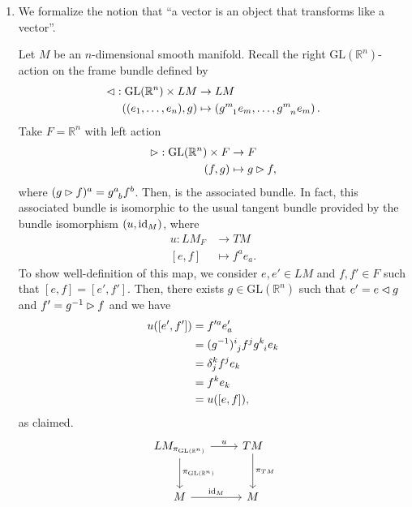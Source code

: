 \begin{example}
    \begin{enumerate}[label=(\alph*)]
        \item We formalize the notion that \enquote{a vector is an object that transforms like a vector}.

            Let \(M\) be an \(n\)-dimensional smooth manifold. Recall the right \(\mathrm{GL}(\mathbb{R}^n)\)-action on the frame bundle  defined by
            \begin{align*}
                \ract : \mathrm{GL}(\mathbb{R}^n) \times LM &\to LM\\
                \left((e_1, \dots, e_n), g\right) &\mapsto \left(g\indices{^m_1}e_m, \dots, g\indices{^m_n}e_m\right).
            \end{align*}
            Take \(F = \mathbb{R}^n\) with left action
            \begin{align*}
                \mathbin{\vartriangleright} : \mathrm{GL}(\mathbb{R}^n) \times F &\to F\\
                                                     (f,g) &\mapsto g \mathbin{\vartriangleright} f,
            \end{align*}
            where \((g\lact f)^a = g\indices{^a_b}f^b\). Then,  is the associated bundle. In fact, this associated bundle is isomorphic to the usual tangent bundle provided by the bundle isomorphism \((u, \operatorname{id}_{M})\), where
            \begin{align*}
                u : LM_F &\to TM\\
                   [e,f] &\mapsto f^ae_a.
            \end{align*}
            To show well-definition of this map, we consider \(e,e' \in LM\) and \(f,f' \in F\) such that \([e, f]= [e', f']\). Then, there exists \(g \in \mathrm{GL}(\mathbb{R}^n)\) such that \(e' = e \mathbin{\vartriangleleft} g\) and \(f' = g^{-1} \mathbin{\vartriangleright} f\) and we have
            \begin{align*}
                u([e', f']) &= f'^ae'_a\\
                            &= (g^{-1})\indices{^i_j}f^j g\indices{^k_i}e_k\\
                            &= \delta^k_j f^j e_k\\
                            &= f^k e_k\\
                            &= u([e,f]),
            \end{align*}
            as claimed.
            \begin{equation*}
                \begin{tikzcd}[column sep = normal, row sep = large]
                    LM_{\pi_{\mathrm{GL}(\mathbb{R}^n)}} \arrow{r}{u} \arrow{d}{\pi_{\mathrm{GL}(\mathbb{R}^n)}} & TM \arrow{d}{\pi_{TM}}\\
                    M \arrow{r}{\id{M}} & M
                \end{tikzcd}
            \end{equation*}


\end{enumerate}
\end{example}
